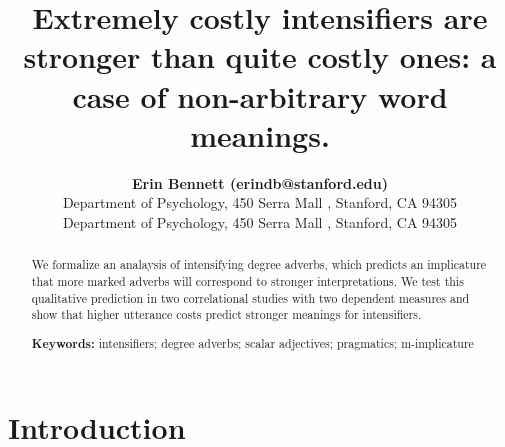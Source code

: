 \documentclass[10pt,letterpaper]{article}
\title{Extremely costly intensifiers are stronger than quite costly ones: a case of non-arbitrary word meanings.}
\author{{\large \bf Erin Bennett (erindb@stanford.edu)} \\
  Department of Psychology, 450 Serra Mall , Stanford, CA 94305
  \AND {\large \bf Noah Goodman (ngoodman@stanford.edu)} \\
  Department of Psychology, 450 Serra Mall , Stanford, CA 94305}
\begin{document}
\maketitle

\begin{abstract}

We formalize an analaysis of intensifying degree adverbs, which predicts an implicature that more marked adverbs will correspond to stronger interpretations. We test this qualitative prediction in two correlational studies with two dependent measures and show that higher utterance costs predict stronger meanings for intensifiers.

\textbf{Keywords:} 
intensifiers; degree adverbs; scalar adjectives; pragmatics; m-implicature
\end{abstract}

\section{Introduction}

\end{document}

